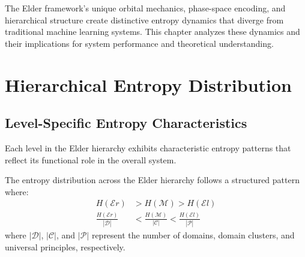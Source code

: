 The Elder framework's unique orbital mechanics, phase-space encoding, and hierarchical structure create distinctive entropy dynamics that diverge from traditional machine learning systems. This chapter analyzes these dynamics and their implications for system performance and theoretical understanding.

\section{Hierarchical Entropy Distribution}

\subsection{Level-Specific Entropy Characteristics}

Each level in the Elder hierarchy exhibits characteristic entropy patterns that reflect its functional role in the overall system.

\begin{theorem}
The entropy distribution across the Elder hierarchy follows a structured pattern where:
\begin{align}
H(\mathcal{E}r) &> H(\mathcal{M}) > H(\mathcal{E}l) \\
\frac{H(\mathcal{E}r)}{|\mathcal{D}|} &< \frac{H(\mathcal{M})}{|\mathcal{C}|} < \frac{H(\mathcal{E}l)}{|\mathcal{P}|}
\end{align}
where $|\mathcal{D}|$, $|\mathcal{C}|$, and $|\mathcal{P}|$ represent the number of domains, domain clusters, and universal principles, respectively.
\end{theorem}


